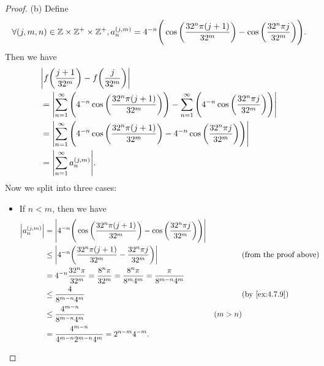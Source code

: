 \begin{proof}{(b)}
  Define
  \[
    \forall (j, m, n) \in \mathbb{Z} \times \mathbb{Z}^+ \times \mathbb{Z}^+, a_n^{(j, m)} = 4^{-n} \Bigg(\cos\bigg(\dfrac{32^n \pi (j + 1)}{32^m}\bigg) - \cos\bigg(\dfrac{32^n \pi j}{32^m}\bigg)\Bigg).
  \]
  Then we have
  \begin{align*}
     & \abs{f\bigg(\dfrac{j + 1}{32^m}\bigg) - f\bigg(\dfrac{j}{32^m}\bigg)}                                                                                                           \\
     & = \abs{\sum_{n = 1}^\infty \Bigg(4^{-n} \cos\bigg(\dfrac{32^n \pi (j + 1)}{32^m}\bigg)\Bigg) - \sum_{n = 1}^\infty \Bigg(4^{-n} \cos\bigg(\dfrac{32^n \pi j}{32^m}\bigg)\Bigg)} \\
     & = \abs{\sum_{n = 1}^\infty \Bigg(4^{-n} \cos\bigg(\dfrac{32^n \pi (j + 1)}{32^m}\bigg) - 4^{-n} \cos\bigg(\dfrac{32^n \pi j}{32^m}\bigg)\Bigg)}                                 \\
     & = \abs{\sum_{n = 1}^\infty a_n^{(j, m)}}.
  \end{align*}
  Now we split into three cases:
  \begin{itemize}
    \item If \(n < m\), then we have
          \begin{align*}
            \abs{a_n^{(j, m)}} & = \abs{4^{-n} \Bigg(\cos\bigg(\dfrac{32^n \pi (j + 1)}{32^m}\bigg) - \cos\bigg(\dfrac{32^n \pi j}{32^m}\bigg)\Bigg)}                                           \\
                               & \leq \abs{4^{-n} \bigg(\dfrac{32^n \pi (j + 1)}{32^m} - \dfrac{32^n \pi j}{32^m}\bigg)}                              &         & \text{(from the proof above)} \\
                               & = 4^{-n} \dfrac{32^n \pi}{32^m} = \dfrac{8^n \pi}{32^m} = \dfrac{8^n \pi}{8^m 4^m} = \dfrac{\pi}{8^{m - n} 4^m}                                                \\
                               & \leq \dfrac{4}{8^{m - n} 4^m}                                                                                        &         & \text{(by \cref{ex:4.7.9})}   \\
                               & \leq \dfrac{4^{m - n}}{8^{m - n} 4^m}                                                                                & (m > n)                                 \\
                               & = \dfrac{4^{m - n}}{4^{m - n} 2^{m - n} 4^m} = 2^{n - m} 4^{-m}.
          \end{align*}

\end{itemize}
\end{proof}
